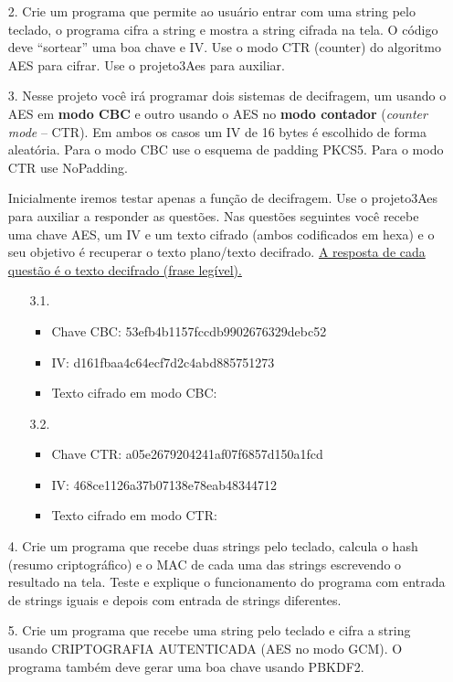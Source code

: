 \documentclass[12pt,a4paper]{article}
\begin{document}
\begin{enumerate}
			\item[2.] Crie um programa que permite ao usuário entrar com uma string pelo teclado, o programa cifra a string e mostra a string cifrada na tela. O código deve ``sortear'' uma boa chave e IV. Use o modo CTR (counter) do algoritmo AES para cifrar. Use o projeto3Aes para auxiliar.
			
			\item[3.] Nesse projeto você irá programar dois sistemas de decifragem, um usando o AES em \textbf{modo CBC} e outro usando o AES no \textbf{modo contador} (\textit{counter mode} -- CTR). Em ambos os casos um IV de 16 bytes é escolhido de forma aleatória. Para o modo CBC use o esquema de padding PKCS5. Para o modo CTR use NoPadding.
			
				Inicialmente iremos testar apenas a função de decifragem. Use o projeto3Aes para auxiliar a responder as questões. Nas questões seguintes você recebe uma chave AES, um IV e um texto cifrado (ambos
codificados em hexa) e o seu objetivo é recuperar o texto plano/texto decifrado. \uline{A resposta de cada questão é o texto decifrado (frase legível).}
				
				\begin{enumerate}
					\item[3.1.] 
						\begin{itemize}
							\item Chave CBC: 53efb4b1157fccdb9902676329debc52
							\item IV: d161fbaa4c64ecf7d2c4abd885751273
							\item Texto cifrado em modo CBC: 
						\end{itemize}
						
					\item[3.2.]
						\begin{itemize}
							\item Chave CTR: a05e2679204241af07f6857d150a1fcd
							\item IV: 468ce1126a37b07138e78eab48344712
							\item Texto cifrado em modo CTR: 
						\end{itemize}
				\end{enumerate}
			
			\item[4.] Crie um programa que recebe duas strings pelo teclado, calcula o hash (resumo criptográfico) e o MAC de cada uma das strings escrevendo o resultado na tela. Teste e explique o funcionamento do programa com entrada de strings iguais e depois com entrada de strings diferentes.
			
			\item[5.] Crie um programa que recebe uma string pelo teclado e cifra a string usando CRIPTOGRAFIA AUTENTICADA (AES no modo GCM). O programa também deve gerar uma boa chave usando PBKDF2.
		\end{enumerate}	
\end{document}
